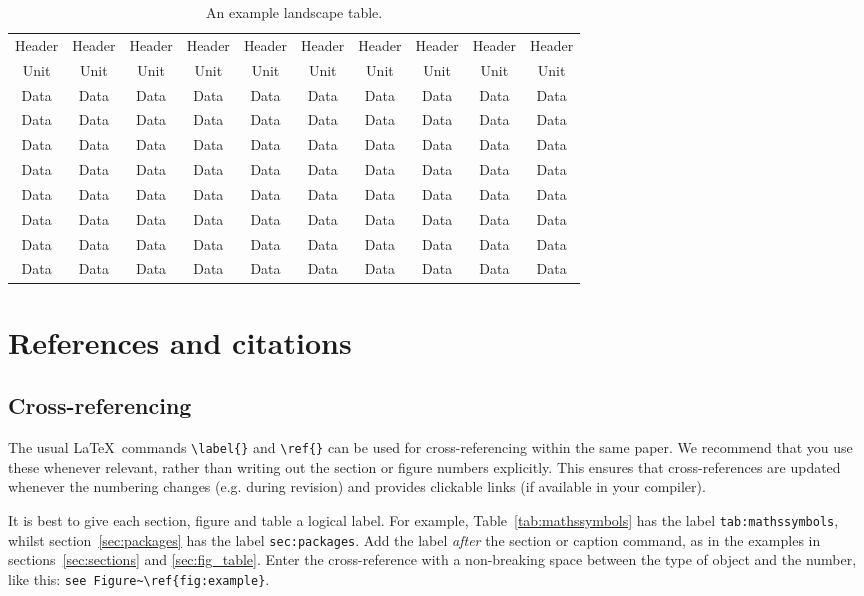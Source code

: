 \documentclass[fleqn,usenatbib,useAMS]{mnras}
\begin{document}
\begin{landscape}
 \begin{table}
  \caption{An example landscape table.}
  \label{tab:landscape}
  \begin{tabular}{cccccccccc}
    \hline
    Header & Header & Header & Header & Header & Header & Header & Header & Header & Header\\
    Unit & Unit & Unit & Unit & Unit & Unit & Unit & Unit & Unit & Unit \\
    \hline
    Data & Data & Data & Data & Data & Data & Data & Data & Data & Data\\
    Data & Data & Data & Data & Data & Data & Data & Data & Data & Data\\
    Data & Data & Data & Data & Data & Data & Data & Data & Data & Data\\
    Data & Data & Data & Data & Data & Data & Data & Data & Data & Data\\
    Data & Data & Data & Data & Data & Data & Data & Data & Data & Data\\
    Data & Data & Data & Data & Data & Data & Data & Data & Data & Data\\
    Data & Data & Data & Data & Data & Data & Data & Data & Data & Data\\
    Data & Data & Data & Data & Data & Data & Data & Data & Data & Data\\
    \hline
  \end{tabular}
 \end{table}
\end{landscape}

\section{References and citations}

\subsection{Cross-referencing}

The usual \LaTeX\ commands \verb'\label{}' and \verb'\ref{}' can be used for cross-referencing within the same paper.
We recommend that you use these whenever relevant, rather than writing out the section or figure numbers explicitly.
This ensures that cross-references are updated whenever the numbering changes (e.g. during revision) and provides clickable links (if available in your compiler).

It is best to give each section, figure and table a logical label.
For example, Table~\ref{tab:mathssymbols} has the label \verb'tab:mathssymbols', whilst section~\ref{sec:packages} has the label \verb'sec:packages'.
Add the label \emph{after} the section or caption command, as in the examples in sections~\ref{sec:sections} and \ref{sec:fig_table}.
Enter the cross-reference with a non-breaking space between the type of object and the number, like this: \verb'see Figure~\ref{fig:example}'.
\end{document}
